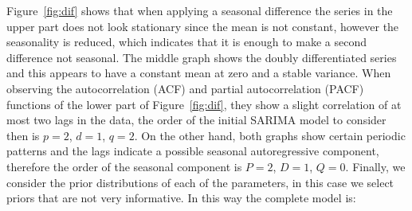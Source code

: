 Figure~\ref{fig:dif} shows that when applying a seasonal difference the series in the upper part does not look stationary since the mean is not constant, however the seasonality is reduced, which indicates that it is enough to make a second difference not seasonal. The middle graph shows the doubly differentiated series and this appears to have a constant mean at zero and a stable variance. When observing the autocorrelation (ACF) and partial autocorrelation (PACF) functions of the lower part of Figure~\ref{fig:dif}, they show a slight correlation of at most two lags in the data, the order of the initial SARIMA model to consider then is $p = 2$, $d = 1$, $q=2$. On the other hand, both graphs show certain periodic patterns and the lags indicate a possible seasonal autoregressive component, therefore the order of the seasonal component is $P=2$, $D=1$, $Q=0$. Finally, we consider the prior distributions of each of the parameters, in this case we select priors that are not very informative. In this way the complete model is:

